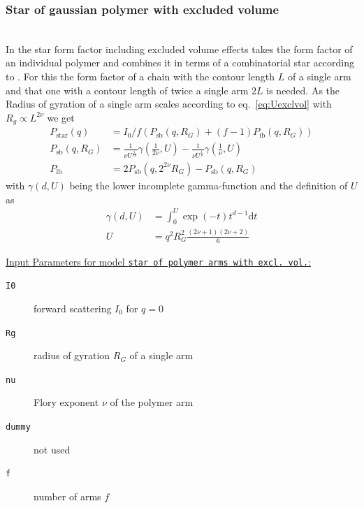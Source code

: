 \subsubsection{Star of gaussian polymer with excluded volume}
\label{sect:StarGaussianExvol}
~\\
In \cite{Hammouda2016} the star form factor including excluded volume effects takes the form factor of an individual polymer and combines it in terms of a combinatorial star according to \cite{Huber1989}. For this the form factor of a chain with the contour length $L$ of a single arm and that one with a contour length  of twice a single arm $2L$ is needed. As the Radius of gyration of a single arm scales according to eq.\ \ref{eq:Uexclvol} with $R_g \propto L^{2\nu}$ we get
\begin{align}
 P_\mathrm{star}(q) &= I_0/f\left(P_\mathrm{sb}(q,R_G) + (f-1)P_\mathrm{ib}(q,R_G) \right) \\
 P_\mathrm{sb}(q,R_G) &= \frac{1}{\nu U^{\frac{1}{2\nu}}}\gamma\left(\frac{1}{2\nu},U\right) -
 \frac{1}{\nu U^{\frac{1}{\nu}}}\gamma\left(\frac{1}{\nu},U\right)\\
 P_\mathrm{ib} &= 2P_\mathrm{sb}(q,2^{2\nu}R_G)-P_\mathrm{sb}(q,R_G)
\end{align}
with $\gamma(d,U)$ being the lower incomplete gamma-function and the definition of $U$ as
\begin{align}
\gamma(d,U) &= \int_0^U \exp(-t) t^{d-1}\mathrm{d}t \\
U &= q^2R_G^2\frac{(2\nu+1)(2\nu+2)}{6}
\end{align}

\vspace{5mm}

\noindent
\uline{Input Parameters for model \texttt{star of polymer arms with excl. vol.}:}
\begin{description}
\item[\texttt{I0}] forward scattering $I_0$ for $q=0$
\item[\texttt{Rg}] radius of gyration $R_G$ of a single arm
\item[\texttt{nu}] Flory exponent $\nu$ of the polymer arm
\item[\texttt{dummy}] not used
\item[\texttt{f}] number of arms $f$
\end{description}


